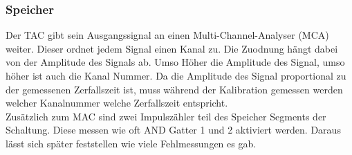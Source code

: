 \subsubsection{Speicher}
Der TAC gibt sein Ausgangssignal an einen Multi-Channel-Analyser (MCA) weiter.
Dieser ordnet jedem Signal einen Kanal zu.
Die Zuodnung hängt dabei von der Amplitude des Signals ab.
Umso Höher die Amplitude des Signal, umso höher ist auch die Kanal Nummer.
Da die Amplitude des Signal proportional zu der gemessenen Zerfallszeit ist, muss während der Kalibration gemessen werden welcher Kanalnummer welche Zerfallszeit entspricht.\\
Zusätzlich zum MAC sind zwei Impulszähler teil des Speicher Segments der Schaltung.
Diese messen wie oft AND Gatter 1 und 2 aktiviert werden.
Daraus lässt sich später feststellen wie viele Fehlmessungen es gab.
